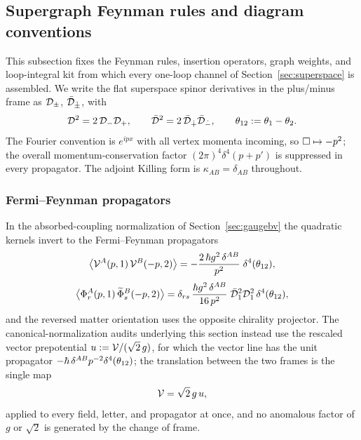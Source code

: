 
\subsection{Supergraph Feynman rules and diagram conventions}%
\label{sec:superspace:rules}

This subsection fixes the Feynman rules, insertion operators, graph weights, and loop-integral kit from which every one-loop channel of Section~\ref{sec:superspace} is assembled. We write the flat superspace spinor derivatives in the plus/minus frame as $\mathcal{D}_\pm$, $\bar{\mathcal{D}}_{\dot\pm}$, with
\begin{equation}\label{eq:ss:rules-dsq}
\mathcal{D}^{2}=2\,\mathcal{D}_{-}\mathcal{D}_{+},
\qquad
\bar{\mathcal{D}}^{2}=2\,\bar{\mathcal{D}}_{\dot+}\bar{\mathcal{D}}_{\dot-},
\qquad
\theta_{12}:=\theta_{1}-\theta_{2} .
\end{equation}
The Fourier convention is $e^{ipx}$ with all vertex momenta incoming, so $\Box\mapsto-p^{2}$; the overall momentum-conservation factor $(2\pi)^{4}\delta^{4}(p+p')$ is suppressed in every propagator. The adjoint Killing form is $\kappa_{AB}=\delta_{AB}$ throughout.

\subsubsection*{Fermi--Feynman propagators}

In the absorbed-coupling normalization of Section~\ref{sec:gaugebv} the quadratic kernels invert to the Fermi--Feynman propagators
\begin{equation}\label{eq:ss:rules-propV}
\big\langle\mathcal{V}^{A}(p,1)\,\mathcal{V}^{B}(-p,2)\big\rangle
=-\frac{2\,\hbar g^{2}\,\delta^{AB}}{p^{2}}\;\delta^{4}(\theta_{12}) ,
\end{equation}
\begin{equation}\label{eq:ss:rules-propM}
\big\langle\Phi_{r}^{A}(p,1)\,\widetilde\Phi_{s}^{B}(-p,2)\big\rangle
=\delta_{rs}\,\frac{\hbar g^{2}\,\delta^{AB}}{16\,p^{2}}\;
\bar{\mathcal{D}}_{1}^{2}\mathcal{D}_{1}^{2}\,\delta^{4}(\theta_{12}) ,
\end{equation}
and the reversed matter orientation uses the opposite chirality projector. The canonical-normalization audits underlying this section instead use the rescaled vector prepotential $u:=\mathcal{V}/(\sqrt2\,g)$, for which the vector line has the unit propagator $-\hbar\,\delta^{AB}p^{-2}\delta^{4}(\theta_{12})$; the translation between the two frames is the single map
\begin{equation}\label{eq:ss:rules-canonical}
\mathcal{V}=\sqrt2\,g\,u ,
\end{equation}
applied to every field, letter, and propagator at once, and no anomalous factor of $g$ or $\sqrt2$ is generated by the change of frame.

